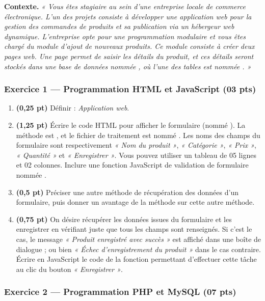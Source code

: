 \noindent\textbf{Contexte.} \emph{« Vous êtes stagiaire au sein d'une entreprise locale de
commerce électronique. L'un des projets consiste à développer une application web pour la
gestion des commandes de produits et sa publication via un hébergeur web dynamique.
L'entreprise opte pour une programmation modulaire et vous êtes chargé du module d'ajout de
nouveaux produits. Ce module consiste à créer deux pages web. Une page permet de saisir les
détails du produit, et ces détails seront stockés dans une base de données nommée
, où l'une des tables est nommée . »}

\subsubsection*{Exercice 1 — Programmation HTML et JavaScript \hfill (03 pts)}

\begin{enumerate}[label=\textbf{\arabic*.}]
\item \textbf{(0,25 pt)} Définir : \emph{Application web}.
\item \textbf{(1,25 pt)} Écrire le code HTML pour afficher le formulaire (nommé
). La méthode est , et le fichier de traitement est nommé
. Les noms des champs du formulaire sont respectivement
\emph{« Nom du produit »}, \emph{« Catégorie »}, \emph{« Prix »}, \emph{« Quantité »} et
\emph{« Enregistrer »}. Vous pouvez utiliser un tableau de 05 lignes et 02 colonnes. Inclure
une fonction JavaScript de validation de formulaire nommée .
\item \textbf{(0,5 pt)} Préciser une autre méthode de récupération des données d'un
formulaire, puis donner un avantage de la méthode  sur cette autre méthode.
\item \textbf{(0,75 pt)} On désire récupérer les données issues du formulaire et les
enregistrer en vérifiant juste que tous les champs sont renseignés. Si c'est le cas, le
message \emph{« Produit enregistré avec succès »} est affiché dans une boîte de dialogue ;
ou bien \emph{« Échec d'enregistrement du produit »} dans le cas contraire. Écrire en
JavaScript le code de la fonction  permettant d'effectuer cette tâche
au clic du bouton \emph{« Enregistrer »}.
\end{enumerate}

\subsubsection*{Exercice 2 — Programmation PHP et MySQL \hfill (07 pts)}

